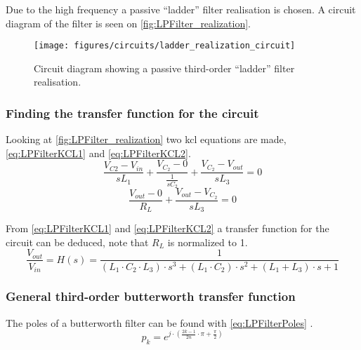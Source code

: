 Due to the high frequency a passive “ladder” filter realisation is chosen. A circuit diagram of the filter is seen on \autoref{fig:LPFilter_realization}. 
\begin{figure}[h]
    \centering
        \texttt{[image: figures/circuits/ladder\_realization\_circuit]}
        \caption{Circuit diagram showing a passive third-order “ladder” filter realisation.}
        \label{fig:LPFilter_realization}
\end{figure}

\subsubsection{Finding the transfer function for the circuit}
Looking at \autoref{fig:LPFilter_realization} two \gls{kcl} equations are made, \autoref{eq:LPFilterKCL1} and \autoref{eq:LPFilterKCL2}. 
\begin{equation} \label{eq:LPFilterKCL1} 
\frac{V_{C2} - V_{in}}{sL_{1}} + \frac{V_{C_{2}} - 0}{\frac{1}{sC_{2}}} + \frac{V_{C_{2}} - V_{out}}{sL_{3}} = 0
\end{equation}
\begin{equation} \label{eq:LPFilterKCL2} 
\frac{V_{out} - 0}{R_{L}} + \frac{V_{out} - V_{C_{2}}}{sL_{3}} = 0
\end{equation}

From \autoref{eq:LPFilterKCL1} and \autoref{eq:LPFilterKCL2} a transfer function for the circuit can be deduced, note that $R_{L}$ is normalized to 1.
\begin{equation} \label{eq:LPFilterTfansfer1}  
\frac{V_{out}}{V_{in}} = H(s) = \frac{1}{(L_1 \cdot C_2 \cdot L_3) \cdot s^{3}+(L_1 \cdot C_2) \cdot s^{2}+(L_1+L_3) \cdot s + 1}
\end{equation}

\subsubsection{General third-order butterworth transfer function}
The poles of a butterworth filter can be found with \autoref{eq:LPFilterPoles} \citep{AnagogFilters}. 
\begin{equation} 
p_{k} = e^{j \cdot \left( \frac{2k -1}{2n} \cdot \pi +\frac{\pi}{2} \right) } \label{eq:LPFilterPoles} 
\end{equation}
\startexplain
{}
\stopexplain

